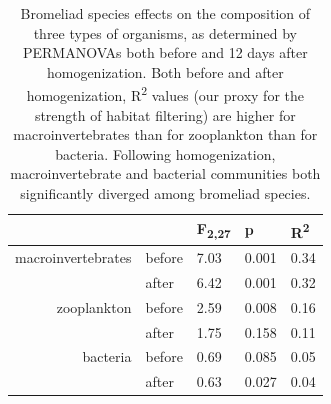 \begin{table}[h]
\centering 
\begin{tabular}[c]{r l l l l} 

\toprule
                   &         & F\textsubscript{2,27} & p & R\textsuperscript{2} \\
\midrule
macroinvertebrates & before  & 7.03 & 0.001 & 0.34 \\
                   & after   & 6.42 & 0.001 & 0.32 \\
zooplankton        & before  & 2.59 & 0.008 & 0.16 \\
                   & after   & 1.75 & 0.158 & 0.11 \\
bacteria           & before  & 0.69 & 0.085 & 0.05 \\
                   & after   & 0.63 & 0.027 & 0.04 \\
\bottomrule
\end{tabular}
\caption[Bromeliad species effects on the composition of three groups of organisms]{Bromeliad species effects on the composition of three types of
organisms, as determined by PERMANOVAs both before and 12 days after
homogenization. Both before and after homogenization,
R\textsuperscript{2} values (our proxy for the strength of habitat
filtering) are higher for macroinvertebrates than for zooplankton than
for bacteria. Following homogenization, macroinvertebrate and bacterial
communities both significantly diverged among bromeliad species.} 
\label{tab:rsquares} 
\end{table} 

